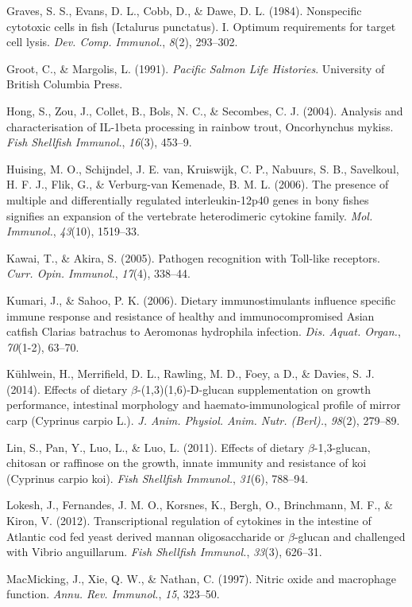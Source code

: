 \documentclass[12pt,a4paper,oneside]{scrbook}
\begin{document}
Graves, S. S., Evans, D. L., Cobb, D., \& Dawe, D. L. (1984).
Nonspecific cytotoxic cells in fish (Ictalurus punctatus). I. Optimum
requirements for target cell lysis. \emph{Dev. Comp. Immunol.},
\emph{8}(2), 293--302.

Groot, C., \& Margolis, L. (1991). \emph{Pacific Salmon Life Histories}.
University of British Columbia Press.

Hong, S., Zou, J., Collet, B., Bols, N. C., \& Secombes, C. J. (2004).
Analysis and characterisation of IL-1beta processing in rainbow trout,
Oncorhynchus mykiss. \emph{Fish Shellfish Immunol.}, \emph{16}(3),
453--9.

Huising, M. O., Schijndel, J. E. van, Kruiswijk, C. P., Nabuurs, S. B.,
Savelkoul, H. F. J., Flik, G., \& {Verburg-van Kemenade}, B. M. L.
(2006). The presence of multiple and differentially regulated
interleukin-12p40 genes in bony fishes signifies an expansion of the
vertebrate heterodimeric cytokine family. \emph{Mol. Immunol.},
\emph{43}(10), 1519--33.

Kawai, T., \& Akira, S. (2005). Pathogen recognition with Toll-like
receptors. \emph{Curr. Opin. Immunol.}, \emph{17}(4), 338--44.

Kumari, J., \& Sahoo, P. K. (2006). Dietary immunostimulants influence
specific immune response and resistance of healthy and immunocompromised
Asian catfish Clarias batrachus to Aeromonas hydrophila infection.
\emph{Dis. Aquat. Organ.}, \emph{70}(1-2), 63--70.

Kühlwein, H., Merrifield, D. L., Rawling, M. D., Foey, a D., \& Davies,
S. J. (2014). Effects of dietary $\beta$-(1,3)(1,6)-D-glucan
supplementation on growth performance, intestinal morphology and
haemato-immunological profile of mirror carp (Cyprinus carpio L.).
\emph{J. Anim. Physiol. Anim. Nutr. (Berl).}, \emph{98}(2), 279--89.

Lin, S., Pan, Y., Luo, L., \& Luo, L. (2011). Effects of dietary
$\beta$-1,3-glucan, chitosan or raffinose on the growth, innate immunity
and resistance of koi (Cyprinus carpio koi). \emph{Fish Shellfish
Immunol.}, \emph{31}(6), 788--94.

Lokesh, J., Fernandes, J. M. O., Korsnes, K., Bergh, O., Brinchmann, M.
F., \& Kiron, V. (2012). Transcriptional regulation of cytokines in the
intestine of Atlantic cod fed yeast derived mannan oligosaccharide or
$\beta$-glucan and challenged with Vibrio anguillarum. \emph{Fish
Shellfish Immunol.}, \emph{33}(3), 626--31.

MacMicking, J., Xie, Q. W., \& Nathan, C. (1997). Nitric oxide and
macrophage function. \emph{Annu. Rev. Immunol.}, \emph{15}, 323--50.
\end{document}
